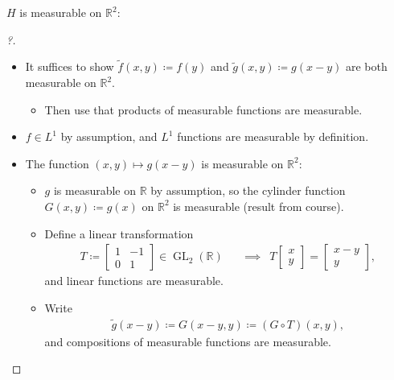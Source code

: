 \begin{solution}
\begin{claim}

\(H\) is measurable on \({\mathbb{R}}^2\):

\end{claim}

\begin{proof}[?]

\envlist

\begin{itemize}
\tightlist
\item
  It suffices to show \(\tilde f(x, y) \coloneqq f(y)\) and
  \(\tilde g(x, y) \coloneqq g(x-y)\) are both measurable on
  \({\mathbb{R}}^2\).

  \begin{itemize}
  \tightlist
  \item
    Then use that products of measurable functions are measurable.
  \end{itemize}
\item
  \(f \in L^1\) by assumption, and \(L^1\) functions are measurable by
  definition.
\item
  The function \((x, y) \mapsto g(x-y)\) is measurable on
  \({\mathbb{R}}^2\):

  \begin{itemize}
  \tightlist
  \item
    \(g\) is measurable on \({\mathbb{R}}\) by assumption, so the
    cylinder function \(G(x, y) \coloneqq g(x)\) on \({\mathbb{R}}^2\)
    is measurable (result from course).
  \item
    Define a linear transformation
    \begin{align*}
    T \coloneqq
    \begin{bmatrix}
    1 & -1 
    \\
    0 & 1
    \end{bmatrix}
    \in \operatorname{GL}_2({\mathbb{R}})
    && \implies \,\,\,
    T
    \begin{bmatrix}
     x 
    \\
     y 
    \end{bmatrix}
    =
    \begin{bmatrix}
    x-y   
    \\
    y  
    \end{bmatrix}
    ,\end{align*}
    and linear functions are measurable.
  \item
    Write
    \begin{align*}
    \tilde g(x-y) \coloneqq G(x-y, y) \coloneqq(G\circ T)(x, y)
    ,\end{align*}
    and compositions of measurable functions are measurable.
  \end{itemize}
\end{itemize}


\end{proof}
\end{solution}
